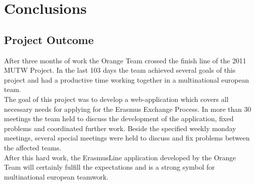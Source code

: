 \chapter{Conclusions}
\section{Project Outcome}
After three months of work the Orange Team crossed the finish
line of the 2011 MUTW Project. In the last 103 days the team achieved several goals of this
project and had a productive time working together in a multinational european
team.\\
The goal of this project was to develop a web-application which covers
all necessary needs for applying for the Erasmus Exchange Process. In more than
30 meetings the team held to discuss the development of the application, fixed
problems and coordinated further work. Beside the specified weekly monday
meetings, several special meetings were held to discuss and fix problems between
the affected teams.\\
After this hard work, the ErasmusLine application developed
by the Orange Team will certainly fulfill the expectations and is a strong
symbol for multinational european teamwork.

